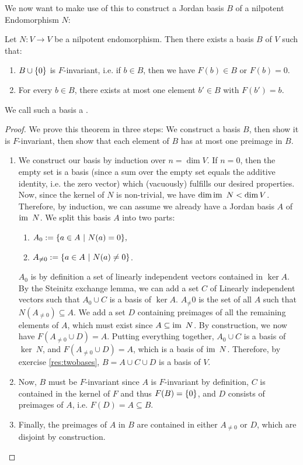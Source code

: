 We now want to make use of this to construct a Jordan basis $B$ of a nilpotent Endomorphism $N$:
\begin{corollary}
	\label{res:jordanbasis}
	Let $N : V \to V$ be a nilpotent endomorphism. Then there exists a basis $B$ of $V$ such that:
	\begin{enumerate}
		\item $B \cup \qty{0}$ is $F$-invariant, i.e. if $b \in B$, then we have $F(b) \in B$ or $F(b) = 0$.
		\item For every $b \in B$, there exists at most one element $b' \in B$ with $F(b') = b$.
	\end{enumerate}
	We call such a basis a .
\end{corollary}
\begin{proof}
	We prove this theorem in three steps: We construct a basis $B$, then show it is $F$-invariant, then show that each element of $B$ has at most one preimage in $B$.
	\begin{enumerate}
		\item  
		We construct our basis by induction over $n = \dim V$.
		\newpar
		If $n = 0$, then the empty set is a basis (since a sum over the empty set equals the additive identity, i.e. the zero vector) which (vacuously) fulfills our desired properties.
		\newpar
		Now, since the kernel of $N$ is non-trivial, we have $\dim \operatorname{im}~ N < \dim V$. Therefore, by induction, we can assume we already have a Jordan basis $A$ of $\operatorname{im}~ N$. We split this basis $A$ into two parts:
		\begin{enumerate}
			\item $A_0 := \qty{a \in A ~\middle|~N(a) = 0},$
			\item $A_{\neq 0} := \qty{a \in A ~\middle|~N(a) \neq 0}$.
		\end{enumerate}
		$A_0$ is by definition a set of linearly independent vectors contained in $\ker A$. By the Steinitz exchange lemma, we can add a set $C$ of Linearly independent vectors such that $A_0 \cup C$ is a basis of $\ker A$.
		\newpar
		$A_\neq 0$ is the set of all $A$ such that $N(A_{\neq 0}) \subseteq A$. We add a set $D$ containing preimages of all the remaining elements of $A$, which must exist since $A \subseteq \operatorname{im}~ N$. By construction, we now have $F(A_{\neq 0} \cup D) = A$.
		\newpar
		Putting everything together, $A_0 \cup C$ is a basis of $\ker~ N$, and $F(A_{\neq 0} \cup D) = A$, which is a basis of $\operatorname{im}~ N$. Therefore, by exercise \ref{res:twobases}, $B = A \cup C \cup D$ is
 		a basis of $V$.
 		\item
 		Now, $B$ must be $F$-invariant since $A$ is $F$-invariant by definition, $C$ is contained in the kernel of $F$ and thus $F(B) = \qty{0}$, and $D$ consists of preimages of $A$, i.e. $F(D) = A \subseteq B$. 
 		\item
 		Finally, the preimages of $A$ in $B$ are contained in either $A_{\neq 0}$ or $D$, which are disjoint by construction.
\end{enumerate}
\end{proof}
